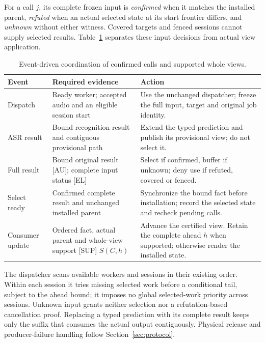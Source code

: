 For a call $j$, its complete frozen input is \emph{confirmed} when it
matches the installed parent, \emph{refuted} when an actual selected state
at its start frontier differs, and \emph{unknown} without either witness.
Covered targets and fenced sessions cannot supply selected results.
Table~\ref{tab:coordinator} separates these input decisions from actual
view application.

\begin{table}[t]
\centering
\caption{Event-driven coordination of confirmed calls and supported
whole views.}
\label{tab:coordinator}
\begingroup\small
\setlength{\tabcolsep}{3pt}
\begin{tabular}{@{}>{\raggedright\arraybackslash}p{}>{\raggedright\arraybackslash}p{}>{\raggedright\arraybackslash}p{}@{}}
\toprule
Event & Required evidence & Action\\
\midrule
Dispatch & Ready worker; accepted audio and an eligible session start &
Use the unchanged dispatcher; freeze the full input, target and original
job identity.\\
ASR result & Bound recognition result and contiguous provisional path &
Extend the typed prediction and publish its provisional view; do not
select it.\\
Full result & Bound original result [AU]; complete input status [EL] &
Select if confirmed, buffer if unknown; deny use if refuted, covered or
fenced.\\
Select ready & Confirmed complete result and unchanged installed parent &
Synchronize the bound fact before installation; record the selected state
and recheck pending calls.\\
Consumer update & Ordered fact, actual parent and whole-view support [SUP]
$S(C,h)$ & Advance the certified view. Retain the complete ahead $h$ when
supported; otherwise render the installed state.\\
\bottomrule
\end{tabular}
\endgroup
\end{table}

The dispatcher scans available workers and sessions in their existing
order. Within each session it tries missing selected work before a
conditional tail, subject to the ahead bound; it imposes no global
selected-work priority across sessions. Unknown input grants neither
selection nor a refutation-based cancellation proof. Replacing a typed
prediction with its complete result keeps only the suffix that consumes
the actual output contiguously. Physical release and producer-failure
handling follow Section~\ref{sec:protocol}.
